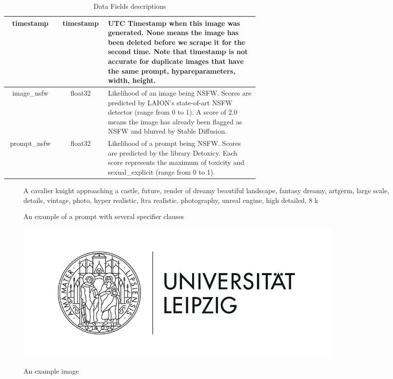 \begin{table}[h]
\begin{center}
\begin{tabular}{||c c p{0.6\linewidth}||}
         \hline
         timestamp & timestamp & UTC Timestamp when this image was generated. None means the image has been deleted before we scrape it for the second time. Note that timestamp is not accurate for duplicate images that have the same prompt, hypareparameters, width, height. \\ 
         \hline
         image\_nsfw & float32 & Likelihood of an image being NSFW. Scores are predicted by LAION's state-of-art NSFW detector (range from 0 to 1). A score of 2.0 means the image has already been flagged as NSFW and blurred by Stable Diffusion. \\ 
         \hline
         prompt\_nsfw & float32 & Likelihood of a prompt being NSFW. Scores are predicted by the library Detoxicy. Each score represents the maximum of toxicity and sexual\_explicit (range from 0 to 1). \\ [1ex] 
         \hline
        \end{tabular}
    \end{center}
    \caption{Data Fields descriptions \autocite{poloclub-diffusiondb}} %
    \label{metadata}
\end{table}


\begin{figure}[h]
    \begin{center}
        A cavalier knight approaching a castle, future, render of dreamy beautiful landscape, fantasy dreamy, artgerm, large scale, details, vintage, photo, hyper realistic, ltra realistic, photography, unreal engine, high detailed, 8 k
    \end{center}
\caption{An example of a prompt with several specifier clauses \autocite{poloclub-diffusiondb}} %
\label{specifier_example}
\end{figure}



\begin{figure}[h]
    \begin{center}
        \includegraphics[height=7cm]{Bilder/Uni-L.png}\\[2.5ex]
    \end{center}
\caption{An example image}
\label{example_image}
\end{figure}


    